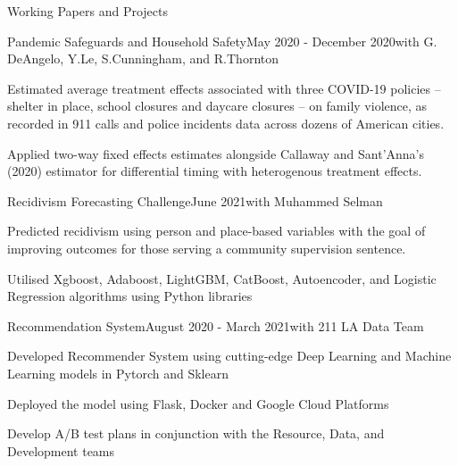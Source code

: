 \documentclass{resume} %
\begin{document}
\begin{rSection}{Working Papers and Projects}
\begin{rSubsection}{Pandemic Safeguards and Household Safety}{May 2020 - December 2020}{with G. DeAngelo, Y.Le, S.Cunningham, and R.Thornton}{}
\item Estimated average treatment effects associated with three COVID-19 policies – shelter in place, school closures and daycare closures – on family violence, as recorded in 911 calls and police incidents data across dozens of American cities.
\item Applied two-way fixed effects estimates alongside Callaway and Sant’Anna’s (2020) estimator for differential timing with heterogenous treatment effects.

\end{rSubsection}
\begin{rSubsection}{Recidivism Forecasting Challenge}{June 2021}{with Muhammed Selman}{}
\item Predicted recidivism using person and place-based variables with the goal of improving outcomes for those serving a community supervision sentence.
\item Utilised Xgboost, Adaboost, LightGBM, CatBoost, Autoencoder, and Logistic Regression algorithms using Python libraries 
\end{rSubsection}
\newpage 
\begin{rSubsection}{Recommendation System}{August 2020 - March 2021}{with 211 LA Data Team}{}
\item Developed Recommender System using cutting-edge Deep Learning and Machine Learning models in Pytorch and Sklearn 
\item Deployed the model using Flask, Docker and Google Cloud Platforms
\item Develop A/B test plans in conjunction with the Resource, Data, and Development teams
\end{rSubsection}


\end{rSection}
\end{document}
